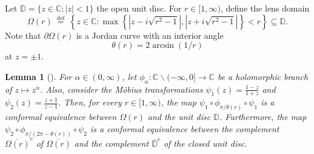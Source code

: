 \documentclass{amsbook}
\newtheorem{lemma}[theorem]{Lemma}
\theoremstyle{definition}
\theoremstyle{remark}
\numberwithin{section}{chapter}
\numberwithin{equation}{chapter}
\newcommand{\1}{\mathbf{1}}
\begin{document}
Let $\mathbb{D}=\{z \in \mathbb{C}:|z|<1\}$ the open unit disc. For $r \in[1, \infty)$, define the lens domain
\begin{equation}\label{omega-r}
\Omega(r) \stackrel{\text { def }}{=}\left\{z \in \mathbb{C}: \max \left\{\left|z-i \sqrt{r^{2}-1}\right|,\left|z+i \sqrt{r^{2}-1}\right|\right\}<r\right\} \subseteq \mathbb{D}.
\end{equation}
Note that $\partial \Omega(r)$ is a Jordan curve with an interior angle 
\begin{equation}\label{theta-r}
\theta(r)=2 \arcsin (1 / r)
\end{equation} 
at $z= \pm 1$.

\begin{lemma}[{\cite[Lemma 27]{EI2020}}]\label{con-map}
For $\alpha \in(0, \infty)$, let $\phi_{\alpha}: \mathbb{C} \backslash(-\infty, 0] \rightarrow \mathbb{C}$ be a holomorphic branch of $z \mapsto z^{\alpha}$. Also, consider the M\"{o}bius transformations $\psi_{1}(z)=\frac{1-z}{1+z}$ and $\psi_{2}(z)=\frac{z+1}{z-1}$. Then, for every $r \in[1, \infty)$, the map $\psi_{1} \circ \phi_{\pi / \theta(r)} \circ \psi_{1}$ is a conformal equivalence between $\Omega(r)$ and the unit disc $\mathbb{D}$. Furthermore, the map $\psi_{2} \circ \phi_{\pi /(2 \pi-\theta(r))} \circ \psi_{2}$ is a conformal equivalence between the complement $\overline{\Omega(r)}^{c}$ of $\overline{\Omega(r)}$ and the complement $\overline{\mathbb{D}}^{c}$ of the closed unit disc.
\end{lemma}
\end{document}
